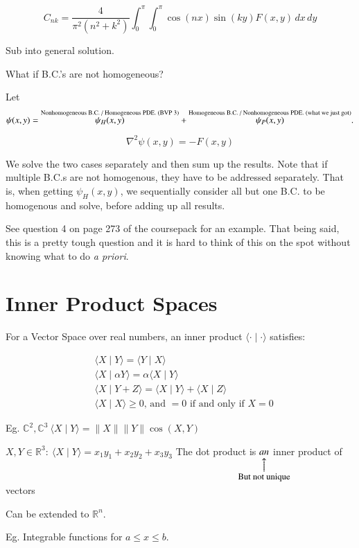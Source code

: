 \documentclass{report}
\makeatletter
\newcommand\parrow[3][3ex]{%
 \begin{array}[t]{@{}c@{}} #2 \\
  \left\uparrow\vcenter{\hrule height #1}\right.\kern-\nulldelimiterspace\\
  \makebox[0pt]{\small#3}
  \end{array}%
}
\makeatother
\begin{document}
$$
\boxed{C_{nk}=\dfrac{4}{\pi^{2}\left(n^{2}+k^{2}\right)} \int_{0}^{\pi}\int_{0}^{\pi}\cos(nx)\sin(ky)F(x,y)\,dx\,dy}
$$


Sub into general solution.

What if B.C.'s are not homogeneous?

Let
\[
\psi(x,y)=\overset{\scriptsize \text{Nonhomogeneous B.C. / Homogeneous PDE. (BVP 3)}}{\psi_H(x,y)}
+\overset{\scriptsize \text{Homogeneous B.C. / Nonhomogeneous PDE. (what we just got)}}{\psi_P(x,y)}.
\]

$$
\nabla^{2} \psi(x, y)=-F(x, y)
$$

We solve the two cases separately and then sum up the results. Note that if multiple B.C.s are not homogenous, they have to be addressed separately. That is, when getting $\psi_{H}(x,y)$, we sequentially consider all but one B.C. to be homogenous and solve, before adding up all results.

See question 4 on page 273 of the coursepack for an example. That being said, this is a pretty tough question and it is hard to think of this on the spot without knowing what to do \emph{a priori}.


\chapter{Inner Product Spaces}

For a Vector Space over real numbers, an inner product $\langle\cdot \mid \cdot\rangle$ satisfies:

$$
\begin{aligned}
& \langle X \mid Y\rangle=\langle Y \mid X\rangle \\
& \langle X \mid \alpha Y\rangle=\alpha\langle X \mid Y\rangle \\
& \langle X \mid Y+Z\rangle=\langle X \mid Y\rangle+\langle X \mid Z\rangle\\
& \langle X \mid X\rangle \geqslant 0 \text {, and }=0 \text { if and only if } X=0
\end{aligned}
$$

Eg. $\mathbb{C}^{2},\mathbb{C}^{3} \ \langle X \mid Y\rangle=\|X\|\|Y\| \cos (X, Y)$

$  X,Y \in \mathbb{R}^{3}: \ \langle X \mid Y\rangle=x_{1} y_{1}+x_{2} y_{2}+x_{3} y_{3}$ The dot product is $\parrow{an}{But not unique}$ inner product of vectors

Can be extended to $\mathbb{R}^{n}$.

Eg. Integrable functions for $a \leqslant x \leqslant b$.
\end{document}
